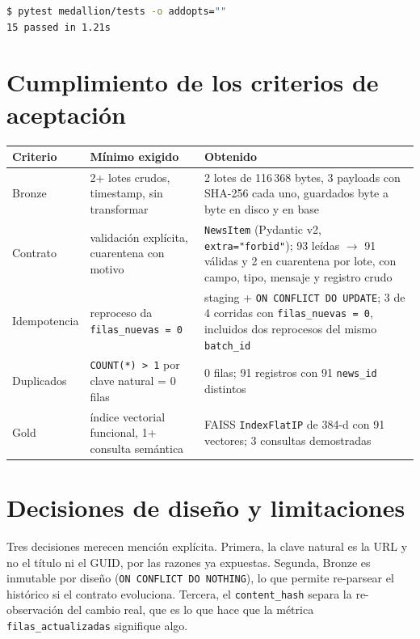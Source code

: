 \documentclass[11pt,a4paper]{article}
\begin{document}
\begin{lstlisting}[language=bash]
$ pytest medallion/tests -o addopts=""
15 passed in 1.21s
\end{lstlisting}

\section{Cumplimiento de los criterios de aceptación}

\begin{center}
\small
\begin{tabular}{@{}p{2.3cm}p{5.6cm}p{7.4cm}@{}}
\toprule
\textbf{Criterio} & \textbf{Mínimo exigido} & \textbf{Obtenido} \\
\midrule
Bronze & 2+ lotes crudos, timestamp, sin transformar &
2 lotes de 116\,368 bytes, 3 payloads con SHA-256 cada uno, guardados byte a
byte en disco y en base \\
\addlinespace
Contrato & validación explícita, cuarentena con motivo &
\texttt{NewsItem} (Pydantic v2, \texttt{extra="forbid"}); 93 leídas $\rightarrow$
91 válidas y 2 en cuarentena por lote, con campo, tipo, mensaje y registro crudo \\
\addlinespace
Idempotencia & reproceso da \texttt{filas\_nuevas = 0} &
staging + \texttt{ON CONFLICT DO UPDATE}; 3 de 4 corridas con
\texttt{filas\_nuevas = 0}, incluidos dos reprocesos del mismo \texttt{batch\_id} \\
\addlinespace
Duplicados & \texttt{COUNT(*) > 1} por clave natural = 0 filas &
0 filas; 91 registros con 91 \texttt{news\_id} distintos \\
\addlinespace
Gold & índice vectorial funcional, 1+ consulta semántica &
FAISS \texttt{IndexFlatIP} de 384-d con 91 vectores; 3 consultas demostradas \\
\bottomrule
\end{tabular}
\end{center}

\section{Decisiones de diseño y limitaciones}

Tres decisiones merecen mención explícita. Primera, la clave natural es la URL y
no el título ni el GUID, por las razones ya expuestas. Segunda, Bronze es
inmutable por diseño (\texttt{ON CONFLICT DO NOTHING}), lo que permite re-parsear
el histórico si el contrato evoluciona. Tercera, el \texttt{content\_hash}
separa la re-observación del cambio real, que es lo que hace que la métrica
\texttt{filas\_actualizadas} signifique algo.
\end{document}
